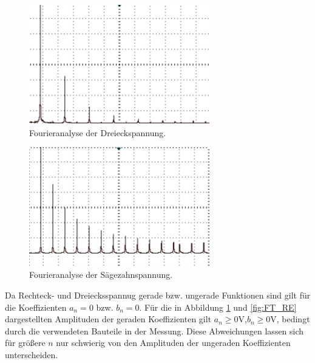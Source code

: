 \begin{figure}
	\centering
		\includegraphics[width=0.7\textwidth]{Bilder/FT_DE2.pdf}		
\caption{Fourieranalyse der Dreieckspannung.}
	\label{fig:FT_DE}
\end{figure}


\begin{figure}
	\centering
		\includegraphics[width=0.7\textwidth]{Bilder/FT_SZ.pdf}		
\caption{Fourieranalyse der Sägezahnspannung.}
	\label{fig:FT_SZ}
\end{figure}

Da Rechteck- und Dreiecksspannug gerade bzw. ungerade Funktionen sind gilt für die Koeffizienten $a_n=0$ bzw. $b_n=0$. Für die in Abbildung \ref{fig:FT_DE} und \ref{fig:FT_RE} dargestellten Amplituden der geraden Koeffizienten gilt $a_n\geqslant0\si\volt$,$b_n\geqslant0\si\volt$, bedingt durch die verwendeten Bauteile in der Messung. Diese Abweichungen lassen sich für größere $n$ nur schwierig von den Amplituden der ungeraden Koeffizienten unterscheiden.

















